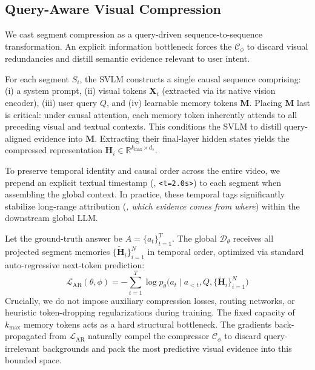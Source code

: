 \subsection{Query-Aware Visual Compression}
\label{sec:method:compression}

We cast segment compression as a query-driven sequence-to-sequence transformation. An explicit information bottleneck forces the $\mathcal{C}_\phi$ to discard visual redundancies and distill semantic evidence relevant to user intent.

For each segment $S_i$, the SVLM constructs a single causal sequence comprising: (i) a system prompt, (ii) visual tokens $\mathbf{X}_i$ (extracted via its native vision encoder), (iii) user query $Q$, and (iv) learnable memory tokens $\mathbf{M}$.
%
Placing $\mathbf{M}$ last is critical: under causal attention, each memory token inherently attends to all preceding visual and textual contexts. This conditions the SVLM to distill query-aligned evidence into $\mathbf{M}$. Extracting their final-layer hidden states yields the compressed representation $\mathbf{H}_i \in \mathbb{R}^{k_{\max}\times d_s}$.

To preserve temporal identity and causal order across the entire video, we prepend an explicit textual timestamp (\eg, \texttt{<t=2.0s>}) to each segment when assembling the global context. In practice, these temporal tags significantly stabilize long-range attribution (\emph{\ie, which evidence comes from where}) within the downstream global LLM.

Let the ground-truth answer be $A=\{a_t\}_{t=1}^{T}$. The global $\mathcal{D}_\theta$ receives all projected segment memories $\{\tilde{\mathbf{H}}_i\}_{i=1}^{N}$ in temporal order, optimized via standard auto-regressive next-token prediction:
%
\begin{equation}
    \mathcal{L}_{\mathrm{AR}}(\theta,\phi) = -\sum_{t=1}^{T}\log p_{\theta}\big(a_t \mid a_{<t}, Q, \{\tilde{\mathbf{H}}_i\}_{i=1}^{N}\big)
    \label{eq:loss}
\end{equation}
%
Crucially, we do not impose auxiliary compression losses, routing networks, or heuristic token-dropping regularizations during training. The fixed capacity of $k_{\max}$ memory tokens acts as a hard structural bottleneck. The gradients back-propagated from $\mathcal{L}_{\mathrm{AR}}$ naturally compel the compressor $\mathcal{C}_\phi$ to discard query-irrelevant backgrounds and pack the most predictive visual evidence into this bounded space.

